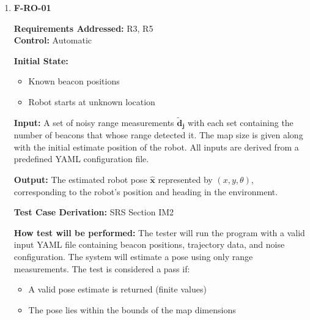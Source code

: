 \documentclass[12pt, titlepage]{article}
\begin{document}
\begin{enumerate}

\item{\textbf{F-RO-01}}

\textbf{Requirements Addressed:} R3, R5\\
\textbf{Control:} Automatic
					
\textbf{Initial State: }
\begin{itemize}
  \item Known beacon positions
  \item Robot starts at unknown location
\end{itemize}
					
\textbf{Input:} A set of noisy range measurements $\mathbf{\tilde{d}_j}$ with each set containing the number of beacons that whose range detected it. The map size is given along with the initial estimate position of the robot. All inputs are derived from a predefined YAML configuration file.

\textbf{Output:} The estimated robot pose $\mathbf{\hat{x}}$ represented by $(x,y,\theta)$, corresponding to the robot's position and heading in the environment.
 

\textbf{Test Case Derivation:} SRS Section IM2
					
\textbf{How test will be performed:} The tester will run the program with a valid input YAML file containing beacon positions, trajectory data, and noise configuration. The system will estimate a pose using only range measurements. The test is considered a pass if:
\begin{itemize}
  \item A valid pose estimate is returned (finite values)
  \item The pose lies within the bounds of the map dimensions
\end{itemize}

\end{enumerate}
\end{document}
